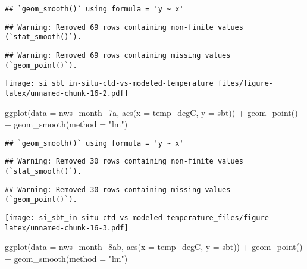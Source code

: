 \documentclass[
]{article}
\newenvironment{Shaded}{\begin{snugshade}}{\end{snugshade}}
\newcommand{\AttributeTok}[1]{\textcolor[rgb]{0.77,0.63,0.00}{#1}}
\newcommand{\FunctionTok}[1]{\textcolor[rgb]{0.00,0.00,0.00}{#1}}
\newcommand{\NormalTok}[1]{#1}
\newcommand{\SpecialCharTok}[1]{\textcolor[rgb]{0.00,0.00,0.00}{#1}}
\newcommand{\StringTok}[1]{\textcolor[rgb]{0.31,0.60,0.02}{#1}}
\begin{document}
\begin{verbatim}
## `geom_smooth()` using formula = 'y ~ x'
\end{verbatim}

\begin{verbatim}
## Warning: Removed 69 rows containing non-finite values (`stat_smooth()`).
\end{verbatim}

\begin{verbatim}
## Warning: Removed 69 rows containing missing values (`geom_point()`).
\end{verbatim}

\texttt{[image: si\_sbt\_in-situ-ctd-vs-modeled-temperature\_files/figure-latex/unnamed-chunk-16-2.pdf]}

\begin{Shaded}
\begin{Highlighting}[]
\FunctionTok{ggplot}\NormalTok{(}\AttributeTok{data =}\NormalTok{ nws\_month\_7a, }\FunctionTok{aes}\NormalTok{(}\AttributeTok{x =}\NormalTok{ temp\_degC, }\AttributeTok{y =}\NormalTok{ sbt)) }\SpecialCharTok{+} \FunctionTok{geom\_point}\NormalTok{() }\SpecialCharTok{+} \FunctionTok{geom\_smooth}\NormalTok{(}\AttributeTok{method =} \StringTok{"lm"}\NormalTok{)}
\end{Highlighting}
\end{Shaded}

\begin{verbatim}
## `geom_smooth()` using formula = 'y ~ x'
\end{verbatim}

\begin{verbatim}
## Warning: Removed 30 rows containing non-finite values (`stat_smooth()`).
\end{verbatim}

\begin{verbatim}
## Warning: Removed 30 rows containing missing values (`geom_point()`).
\end{verbatim}

\texttt{[image: si\_sbt\_in-situ-ctd-vs-modeled-temperature\_files/figure-latex/unnamed-chunk-16-3.pdf]}

\begin{Shaded}
\begin{Highlighting}[]
\FunctionTok{ggplot}\NormalTok{(}\AttributeTok{data =}\NormalTok{ nws\_month\_8ab, }\FunctionTok{aes}\NormalTok{(}\AttributeTok{x =}\NormalTok{ temp\_degC, }\AttributeTok{y =}\NormalTok{ sbt)) }\SpecialCharTok{+} \FunctionTok{geom\_point}\NormalTok{() }\SpecialCharTok{+} \FunctionTok{geom\_smooth}\NormalTok{(}\AttributeTok{method =} \StringTok{"lm"}\NormalTok{)}
\end{Highlighting}
\end{Shaded}
\end{document}
